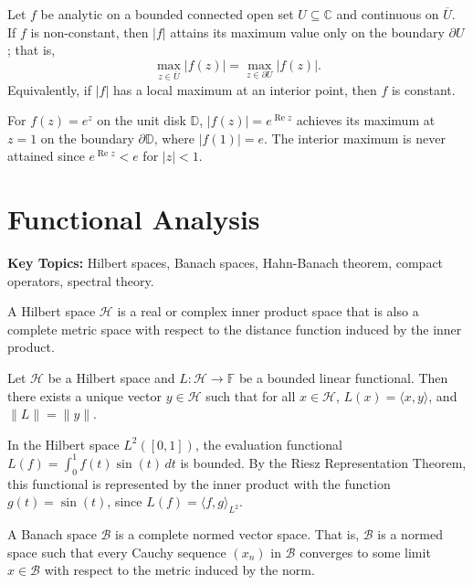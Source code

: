 \begin{theorem}
Let $f$ be analytic on a bounded connected open set $U \subseteq \mathbb{C}$ and continuous on $\overline{U}$. If $f$ is non-constant, then $|f|$ attains its maximum value only on the boundary $\partial U$; that is,
\[
\max_{z \in \overline{U}} |f(z)| = \max_{z \in \partial U} |f(z)|.
\]
Equivalently, if $|f|$ has a local maximum at an interior point, then $f$ is constant.
\end{theorem}

\begin{example}
For $f(z) = e^z$ on the unit disk $\mathbb{D}$, $|f(z)| = e^{\operatorname{Re}z}$ achieves its maximum at $z = 1$ on the boundary $\partial \mathbb{D}$, where $|f(1)| = e$. The interior maximum is never attained since $e^{\operatorname{Re}z} < e$ for $|z| < 1$.
\end{example}

\section{Functional Analysis}

\textbf{Key Topics:} Hilbert spaces, Banach spaces, Hahn-Banach theorem, compact operators, spectral theory.

\begin{definition}
A Hilbert space $\mathcal{H}$ is a real or complex inner product space that is also a complete metric space with respect to the distance function induced by the inner product.
\end{definition}

\begin{theorem}
Let $\mathcal{H}$ be a Hilbert space and $L: \mathcal{H} \to \mathbb{F}$ be a bounded linear functional. Then there exists a unique vector $y \in \mathcal{H}$ such that for all $x \in \mathcal{H}$, $L(x) = \langle x, y \rangle$, and $\|L\| = \|y\|$.
\end{theorem}

\begin{example}
In the Hilbert space $L^2([0,1])$, the evaluation functional $L(f) = \int_0^1 f(t) \sin(t) \, dt$ is bounded. By the Riesz Representation Theorem, this functional is represented by the inner product with the function $g(t) = \sin(t)$, since $L(f) = \langle f, g \rangle_{L^2}$.
\end{example}

\begin{definition}
A Banach space $\mathcal{B}$ is a complete normed vector space. That is, $\mathcal{B}$ is a normed space such that every Cauchy sequence $(x_n)$ in $\mathcal{B}$ converges to some limit $x \in \mathcal{B}$ with respect to the metric induced by the norm.
\end{definition}

